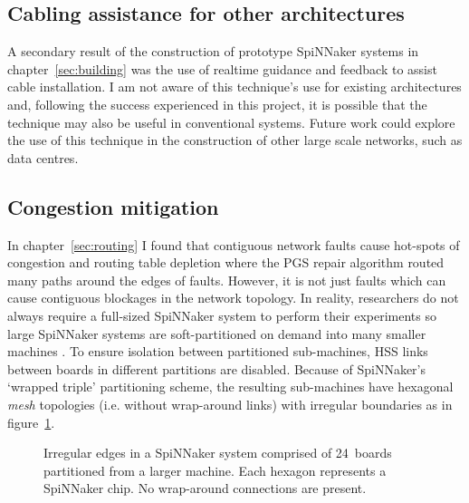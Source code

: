 		\subsection{Cabling assistance for other architectures}
			
			A secondary result of the construction of prototype SpiNNaker systems in
			chapter~\ref{sec:building} was the use of realtime guidance and feedback
			to assist cable installation. I am not aware of this technique's use for
			existing architectures and, following the success experienced in this
			project, it is possible that the technique may also be useful in
			conventional systems. Future work could explore the use of this technique
			in the construction of other large scale networks, such as data centres.
		
		\subsection{Congestion mitigation}
			
			\label{sec:wiggly-board-allocations}
			
			In chapter~\ref{sec:routing} I found that contiguous network faults cause
			hot-spots of congestion and routing table depletion where the PGS repair
			algorithm routed many paths around the edges of faults.  However, it is
			not just faults which can cause contiguous blockages in the network
			topology. In reality, researchers do not always require a full-sized
			SpiNNaker system to perform their experiments so large SpiNNaker systems
			are soft-partitioned on demand into many smaller machines
			\cite{spalloc16}. To ensure isolation between partitioned sub-machines,
			HSS links between boards in different partitions are disabled. Because of
			SpiNNaker's `wrapped triple' partitioning scheme, the resulting
			sub-machines have hexagonal \emph{mesh} topologies (i.e.  without
			wrap-around links) with irregular boundaries as in
			figure~\ref{fig:spalloc-mesh}.
			
			\begin{figure}
				\center
				
				\caption[Irregular edges of a partitioned SpiNNaker system.]%
				{Irregular edges in a SpiNNaker system comprised of 24~boards
				partitioned from a larger machine.  Each hexagon represents a SpiNNaker
				chip. No wrap-around connections are present.}
				\label{fig:spalloc-mesh}
			\end{figure}
			
